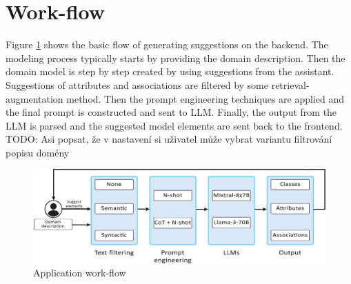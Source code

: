 \section{Work-flow}

Figure \ref{fig:work-flow} shows the basic flow of generating suggestions on the backend. The modeling process typically starts by providing the domain description. Then the domain model is step by step created by using suggestions from the assistant. Suggestions of attributes and associations are filtered by some retrieval-augmentation method. Then the prompt engineering techniques are applied and the final prompt is constructed and sent to LLM. Finally, the output from the LLM is parsed and the suggested model elements are sent back to the frontend. \\

TODO: Asi popsat, že v nastavení si uživatel může vybrat variantu filtrování popisu domény \\

\begin{figure}[!h]
    \centering
    \includegraphics[scale=0.23]{img/work-flow.jpg}
    \caption{\centering Application work-flow}
    \label{fig:work-flow}
\end{figure}
